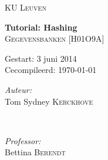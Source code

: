 \begin{titlepage}
\thispagestyle{empty}
\newcommand{\HRule}{\rule{\linewidth}{0.5mm}}
\center
\textsc{\LARGE KU Leuven}\\[1.5cm]
\vfill


{ \Huge \bfseries Tutorial: Hashing}\\[0.4cm]
\textsc{\large Gegevensbanken [H01O9A]}\\[0.5cm]

\vspace{5cm}

\begin{Large}
Gestart: 3 juni 2014\\
Cecompileerd: \today\\
\end{Large}
\vspace{5cm}

\begin{minipage}{0.4\textwidth}
\begin{flushleft} \large
\emph{Auteur:}\\
Tom Sydney \textsc{Kerckhove}
\end{flushleft}
\end{minipage}
~
\begin{minipage}{0.4\textwidth}
\begin{flushright} \large
\emph{Professor:} \\
Bettina \textsc{Berendt}\\
\end{flushright}
\end{minipage}\\[4cm]

\vfill

\end{titlepage}